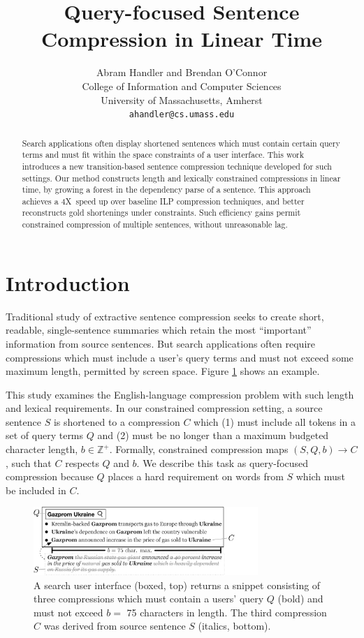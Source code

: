 \documentclass[11pt,a4paper]{article}
\title{Query-focused Sentence Compression in Linear Time}
\author{Abram Handler {\normalfont and} Brendan O'Connor \\
  College of Information and Computer Sciences \\
  University of Massachusetts, Amherst \\
  {\tt ahandler@cs.umass.edu}  \\}
\date{}
\newcommand{\speedup}[0]{4X~}
\begin{document}
\maketitle

\begin{abstract}
Search applications often display shortened sentences which must contain certain query terms and must fit within the space constraints of a user interface. This work introduces a new transition-based sentence compression technique developed for such settings. Our method constructs length and lexically constrained compressions in linear time, by growing a forest in the dependency parse of a sentence. This approach achieves a \speedup speed up over baseline ILP compression techniques, and better reconstructs gold shortenings under constraints. Such efficiency gains permit constrained compression of multiple sentences, without unreasonable lag.
\end{abstract}


\section{Introduction}\label{s:intro}

Traditional study of extractive sentence compression seeks to create short, readable, single-sentence summaries which retain the most ``important'' information from source sentences. But search applications often require compressions which must include a user's query terms and must not exceed some maximum length, permitted by screen space.  Figure \ref{f:qf} shows an example.

This study examines the English-language compression problem with such length and lexical requirements. In our constrained compression setting, a source sentence $S$ is shortened to a compression $C$ which (1) must include all tokens in a set of query terms $Q$ and (2) must be no longer than a maximum budgeted character length, $b \in \mathbb{Z}^{+}$. Formally, constrained compression maps $(S,Q,b) \rightarrow C$, such that $C$ respects $Q$ and $b$. We describe this task as query-focused compression because $Q$ places a hard requirement on words from $S$ which must be included in $C$.

\begin{figure}[htb!]
\includegraphics[width=8.5cm]{qf.pdf}
\caption{A search user interface (boxed, top) returns a snippet consisting of three compressions which must contain a users' query $Q$ (bold) and must not exceed $b=$ 75 characters in length. The third compression $C$ was derived from source sentence $S$ (italics, bottom).}
\label{f:qf}
\end{figure}
\end{document}
